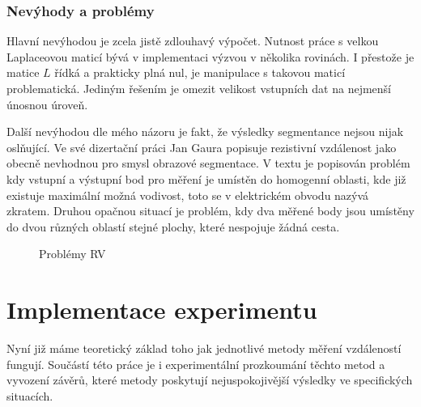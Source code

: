 \documentclass[czech, master, public, dept460, male, cpdeclaration, oneside]{diploma}
\begin{document}
\subsubsection{Nevýhody a problémy}
Hlavní nevýhodou je zcela jistě zdlouhavý výpočet. Nutnost práce s velkou Laplaceovou maticí bývá v implementaci výzvou v několika rovinách. I přestože je matice $L$ řídká a prakticky plná nul, je manipulace s takovou maticí problematická. Jediným řešením je omezit velikost vstupních dat na nejmenší únosnou úroveň.\par
Další nevýhodou dle mého názoru je fakt, že výsledky segmentance nejsou nijak oslňující. Ve své dizertační práci Jan Gaura popisuje rezistivní vzdálenost jako obecně nevhodnou pro smysl obrazové segmentace. V textu je popisován problém kdy vstupní a výstupní bod pro měření je umístěn do homogenní oblasti, kde již existuje maximální možná vodivost, toto se v elektrickém obvodu nazývá zkratem. Druhou opačnou situací je problém, kdy dva měřené body jsou umístěny do dvou různých oblastí stejné plochy, které nespojuje žádná cesta.  \cite{Gaura}

\begin{figure}[H]
	\centering	
	\caption{Problémy RV}
\end{figure}

\section{Implementace experimentu}
Nyní již máme teoretický základ toho jak jednotlivé metody měření vzdáleností fungují. Součástí této práce je i experimentální prozkoumání těchto metod a vyvození závěrů, které metody poskytují nejuspokojivější výsledky ve specifických situacích.
\end{document}
